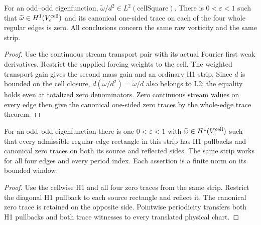 \begin{lemma}
\label{lem:dd-cell-separatrix-h1}
\leanok
For an odd--odd eigenfunction,
$\widetilde\omega/d^2\in L^2(\mathrm{cellSquare})$.
There is $0<\varepsilon<1$ such that
$\widetilde\omega\in H^1(V_\varepsilon^{\rm cell})$ and its canonical
one-sided trace on each of the four whole regular edges is zero.
All conclusions concern the same raw vorticity and the same strip.
\end{lemma}

\begin{proof}
\leanok
Use the continuous stream transport pair with its actual Fourier first
weak derivatives. Restrict the supplied forcing weights to the cell.
The weighted transport gain gives the second mass gain and an ordinary
H1 strip. Since $d$ is bounded on the cell closure,
$d(\widetilde\omega/d^2)=\widetilde\omega/d$ also belongs to L2;
the equality holds even at totalized zero denominators.
Zero continuous stream values on every edge then give the canonical
one-sided zero traces by the whole-edge trace theorem.
\end{proof}

\begin{lemma}
\label{lem:dd-cell-edge-trace-pairs}
\leanok
For an odd--odd eigenfunction there is one $0<\varepsilon<1$ with
$\widetilde\omega\in H^1(V_\varepsilon^{\rm cell})$ such that
every admissible regular-edge rectangle in this strip has H1 pullbacks
and canonical zero traces on both its source and reflected sides.
The same strip works for all four edges and every period index.
Each assertion is a finite norm on its bounded window.
\end{lemma}

\begin{proof}
\leanok
Use the cellwise H1 and all four zero traces from the same strip.
Restrict the diagonal H1 pullback to each source rectangle and reflect it.
The canonical zero trace is retained on the opposite side.
Pointwise periodicity transfers both H1 pullbacks and both trace witnesses
to every translated physical chart.
\end{proof}

